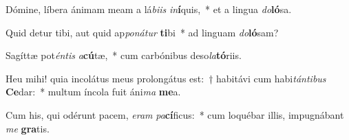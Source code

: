 \item Dómine, líbera ánimam meam a lá\textit{bi}\textit{is} \textit{in}\textbf{í}quis,~* et a lingua \textit{do}\textbf{ló}sa.
\item Quid detur tibi, aut quid ap\textit{po}\textit{ná}\textit{tur} \textbf{ti}bi~* ad linguam \textit{do}\textbf{ló}sam?
\item Sagíttæ pot\textit{én}\textit{tis} \textit{a}\textbf{cú}tæ,~* cum carbónibus deso\textit{la}\textbf{tó}riis.
\item Heu mihi! quia incolátus meus prolongátus est:~† habitávi cum habi\textit{tán}\textit{ti}\textit{bus} \textbf{Ce}dar:~* multum íncola fuit áni\textit{ma} \textbf{me}a.
\item Cum his, qui odérunt pacem, \textit{e}\textit{ram} \textit{pa}\textbf{cí}ficus:~* cum loquébar illis, impugnábant \textit{me} \textbf{gra}tis.
